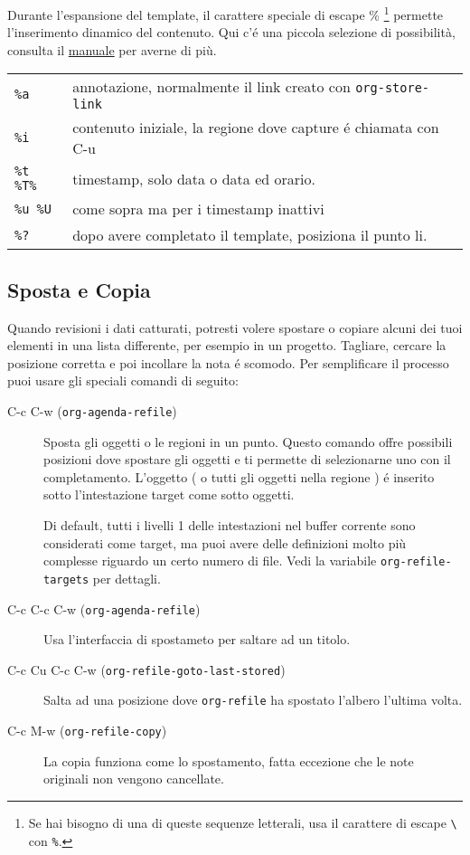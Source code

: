 \documentclass[11pt]{article}
\begin{document}
Durante l'espansione del template, il carattere speciale di escape
\% \footnote{Se hai bisogno di una di queste sequenze letterali, usa il
carattere di escape \texttt{\textbackslash{}} con \texttt{\%}.} permette l'inserimento dinamico del contenuto. Qui c'é una
piccola selezione di possibilità, consulta il \href{manual}{manuale} per averne di
più.

\begin{center}
\begin{tabular}{ll}
\texttt{\%a} & annotazione, normalmente il link creato con \texttt{org-store-link}\\[0pt]
\texttt{\%i} & contenuto iniziale, la regione dove capture é chiamata con C-u\\[0pt]
\texttt{\%t \%T\%} & timestamp, solo data o data ed orario.\\[0pt]
\texttt{\%u \%U} & come sopra ma per i timestamp inattivi\\[0pt]
\texttt{\%?} & dopo avere completato il template, posiziona il punto li.\\[0pt]
\end{tabular}
\end{center}

\subsection{Sposta e Copia}
\label{sec:org800e315}
Quando revisioni i dati catturati, potresti volere spostare o copiare
alcuni dei tuoi elementi in una lista differente, per esempio in un
progetto. Tagliare, cercare la posizione corretta e poi incollare la
nota é scomodo. Per semplificare il processo puoi usare gli speciali
comandi di seguito:

\begin{description}
\item[{C-c C-w (\texttt{org-agenda-refile})}] Sposta gli oggetti o le regioni in un punto. Questo comando offre
possibili posizioni dove spostare gli oggetti e ti permette di
selezionarne uno con il completamento. L'oggetto ( o tutti gli
oggetti nella regione ) é inserito sotto l'intestazione target come
sotto oggetti.

Di default, tutti i livelli 1 delle intestazioni nel buffer corrente
sono considerati come target, ma puoi avere delle definizioni molto
più complesse riguardo un certo numero di file. Vedi la variabile
\texttt{org-refile-targets} per dettagli.

\item[{C-c C-c C-w (\texttt{org-agenda-refile})}] Usa l'interfaccia di spostameto per saltare ad un titolo.

\item[{C-c Cu C-c C-w (\texttt{org-refile-goto-last-stored})}] Salta ad una posizione dove \texttt{org-refile} ha spostato l'albero
l'ultima volta.

\item[{C-c M-w (\texttt{org-refile-copy})}] La copia funziona come lo spostamento, fatta eccezione che le note
originali non vengono cancellate.
\end{description}
\end{document}
